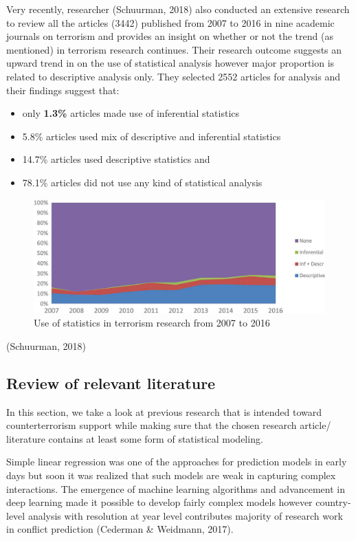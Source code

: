 \documentclass[11pt,oneside,a4paper]{reedthesis}
\providecommand{\tightlist}{%
  \setlength{\itemsep}{0pt}\setlength{\parskip}{0pt}}
\begin{document}
Very recently, researcher (Schuurman, 2018) also conducted an extensive
research to review all the articles (3442) published from 2007 to 2016
in nine academic journals on terrorism and provides an insight on
whether or not the trend (as mentioned) in terrorism research continues.
Their research outcome suggests an upward trend in on the use of
statistical analysis however major proportion is related to descriptive
analysis only. They selected 2552 articles for analysis and their
findings suggest that:
\begin{itemize}
\tightlist
\item
  only \textbf{1.3\%} articles made use of inferential statistics
\item
  5.8\% articles used mix of descriptive and inferential statistics
\item
  14.7\% articles used descriptive statistics and
\item
  78.1\% articles did not use any kind of statistical analysis
\end{itemize}
\begin{figure}
\includegraphics[width=1\linewidth]{figure/research_stats} \caption{Use of statistics in terrorism research from 2007 to 2016}\label{fig:stats1}
\end{figure}
(Schuurman, 2018)

\subsection{Review of relevant
literature}\label{review-of-relevant-literature}

In this section, we take a look at previous research that is intended
toward counterterrorism support while making sure that the chosen
research article/ literature contains at least some form of statistical
modeling.

Simple linear regression was one of the approaches for prediction models
in early days but soon it was realized that such models are weak in
capturing complex interactions. The emergence of machine learning
algorithms and advancement in deep learning made it possible to develop
fairly complex models however country-level analysis with resolution at
year level contributes majority of research work in conflict prediction
(Cederman \& Weidmann, 2017).
\end{document}
